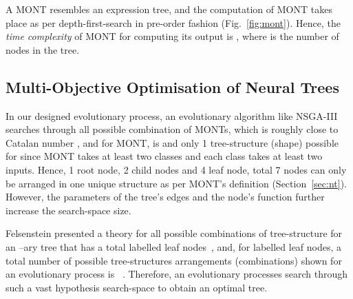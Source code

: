 \documentclass[conference]{IEEEtran}
\begin{document}
A MONT resembles an expression tree, and the computation of MONT takes place as per depth-first-search in pre-order fashion (Fig.~\ref{fig:mont}). Hence, the \textit{time complexity} of MONT for computing its output is , where  is the number of nodes in the tree.

\subsection{Multi-Objective Optimisation of Neural Trees}
\label{sec:mo_ec}
In our designed evolutionary process, an evolutionary algorithm like NSGA-III searches through all possible combination of MONTs, which is roughly close to Catalan number , and for MONT,  is  and only 1 tree-structure (shape) possible for  since MONT takes at least two classes and each class takes at least two inputs. Hence, 1 root node, 2 child nodes and 4 leaf node, total 7 nodes can only be arranged in one unique structure as per MONT's definition (Section~\ref{sec:nt}). However, the parameters of the tree's edges and the node's function further increase the search-space size. 

Felsenstein presented a theory for all possible combinations of tree-structure for an --ary tree that has a total  labelled leaf nodes~\cite{felsenstein1978number}, and, for  labelled leaf nodes, a total number of possible tree-structures arrangements (combinations) shown for an evolutionary process is ~\cite{felsenstein1978number}. Therefore, an evolutionary processes search through such a vast hypothesis search-space to obtain an optimal tree.
\end{document}
